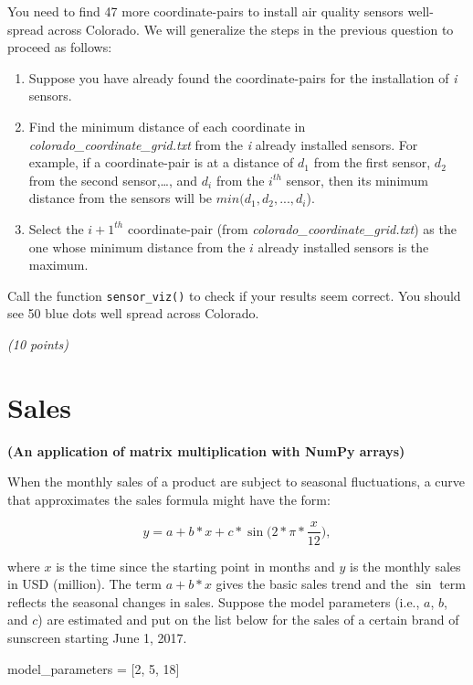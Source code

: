 \documentclass[
  letterpaper,
  DIV=11,
  numbers=noendperiod]{scrreprt}
\newenvironment{Shaded}{\begin{snugshade}}{\end{snugshade}}
\newcommand{\DecValTok}[1]{\textcolor[rgb]{0.68,0.00,0.00}{#1}}
\newcommand{\NormalTok}[1]{\textcolor[rgb]{0.00,0.23,0.31}{#1}}
\newcommand{\OperatorTok}[1]{\textcolor[rgb]{0.37,0.37,0.37}{#1}}
\begin{document}
You need to find 47 more coordinate-pairs to install air quality sensors
well-spread across Colorado. We will generalize the steps in the
previous question to proceed as follows:

\begin{enumerate}
\def\labelenumi{\arabic{enumi}.}
\item
  Suppose you have already found the coordinate-pairs for the
  installation of \emph{i} sensors.
\item
  Find the minimum distance of each coordinate in
  \emph{colorado\_coordinate\_grid.txt} from the \emph{i} already
  installed sensors. For example, if a coordinate-pair is at a distance
  of \(d_1\) from the first sensor, \(d_2\) from the second
  sensor,\ldots, and \(d_i\) from the \(i^{th}\) sensor, then its
  minimum distance from the sensors will be \(min(d_1, d_2, ..., d_i\)).
\item
  Select the \(i+1^{th}\) coordinate-pair (from
  \emph{colorado\_coordinate\_grid.txt}) as the one whose minimum
  distance from the \(i\) already installed sensors is the maximum.
\end{enumerate}

Call the function \texttt{sensor\_viz()} to check if your results seem
correct. You should see 50 blue dots well spread across Colorado.

\emph{(10 points)}

\hypertarget{sales}{%
\section{Sales}\label{sales}}

\textbf{(An application of matrix multiplication with NumPy arrays)}

When the monthly sales of a product are subject to seasonal
fluctuations, a curve that approximates the sales formula might have the
form:

\[y = a + b*x + c*\sin\bigg(2*\pi*\frac{x}{12}\bigg),\]

where \(x\) is the time since the starting point in months and \(y\) is
the monthly sales in USD (million). The term \(a + b*x\) gives the basic
sales trend and the \(\sin\) term reflects the seasonal changes in
sales. Suppose the model parameters (i.e., \(a\), \(b\), and \(c\)) are
estimated and put on the list below for the sales of a certain brand of
sunscreen starting June 1, 2017.

\begin{Shaded}
\begin{Highlighting}[]
\NormalTok{model\_parameters }\OperatorTok{=}\NormalTok{ [}\DecValTok{2}\NormalTok{, }\DecValTok{5}\NormalTok{, }\DecValTok{18}\NormalTok{]}
\end{Highlighting}
\end{Shaded}
\end{document}
